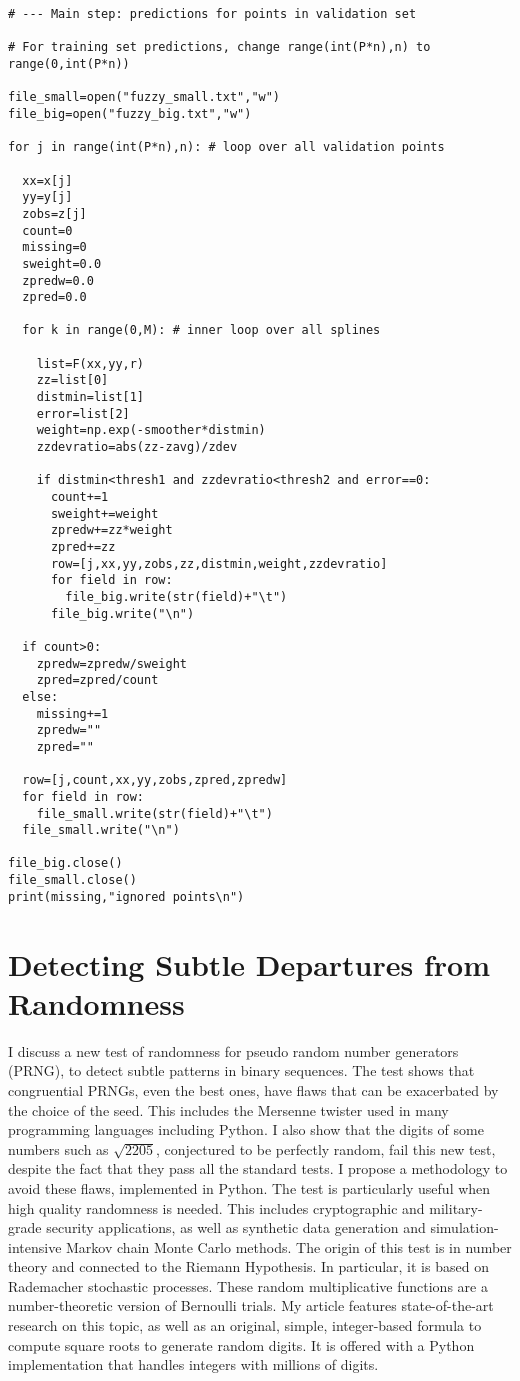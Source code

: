 \documentclass[oneside,10pt]{book}
\newcommand\Chapter[2]{
  \chapter[#1]{#1\\[2ex]\Large\itshape#2}
}
\begin{document}
\begin{lstlisting}
# --- Main step: predictions for points in validation set

# For training set predictions, change range(int(P*n),n) to range(0,int(P*n))

file_small=open("fuzzy_small.txt","w")
file_big=open("fuzzy_big.txt","w")

for j in range(int(P*n),n): # loop over all validation points

  xx=x[j]
  yy=y[j]
  zobs=z[j]
  count=0
  missing=0
  sweight=0.0
  zpredw=0.0
  zpred=0.0

  for k in range(0,M): # inner loop over all splines

    list=F(xx,yy,r)
    zz=list[0]
    distmin=list[1]
    error=list[2]
    weight=np.exp(-smoother*distmin)
    zzdevratio=abs(zz-zavg)/zdev

    if distmin<thresh1 and zzdevratio<thresh2 and error==0:
      count+=1
      sweight+=weight
      zpredw+=zz*weight
      zpred+=zz
      row=[j,xx,yy,zobs,zz,distmin,weight,zzdevratio]
      for field in row:
        file_big.write(str(field)+"\t")
      file_big.write("\n")

  if count>0:
    zpredw=zpredw/sweight
    zpred=zpred/count
  else:
    missing+=1
    zpredw=""
    zpred=""

  row=[j,count,xx,yy,zobs,zpred,zpredw]
  for field in row:
    file_small.write(str(field)+"\t")
  file_small.write("\n")

file_big.close()
file_small.close()
print(missing,"ignored points\n")
\end{lstlisting}

\Chapter{Detecting Subtle Departures from Randomness}{}\label{chapterPRNG}

I discuss a new test of randomness for pseudo random number generators (PRNG), to detect subtle patterns in binary sequences. The test shows that congruential PRNGs, even the best ones, have flaws that can be exacerbated by the choice of the seed. This includes the Mersenne twister used in many programming languages including Python. I also show that the digits of some numbers such as $\sqrt{2205}$, conjectured to be
perfectly random, fail this new test, despite the fact that they pass all the standard tests. I propose a methodology to avoid these flaws, implemented in Python. The test is particularly useful when high quality randomness is needed. This includes cryptographic and military-grade security applications, as well as
synthetic data generation and simulation-intensive \textcolor{index}{Markov chain Monte Carlo} methods.  The origin of this test is in number theory and connected to the Riemann
Hypothesis. In particular, it is based on Rademacher stochastic processes. These random multiplicative functions are a number-theoretic version of Bernoulli trials.  My article features state-of-the-art research on this topic, as well as an original, simple, integer-based formula to compute square roots to generate random digits. It is offered with a Python implementation that handles integers with millions of digits.
\end{document}
